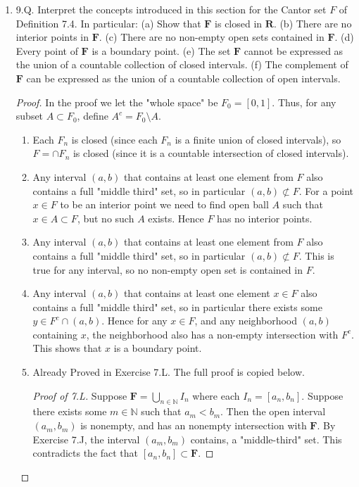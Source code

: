 \begin{enumerate}
\begin{proof}
\begin{enumerate}
	\item The empty set $\emptyset $ is closed and contains $\emptyset $, so $\emptyset \in \mathcal{C}(\emptyset )$ . Hence $\emptyset ^- = \emptyset $.

	\end{enumerate}
\end{proof}


\item 9.Q. Interpret the concepts introduced in this section for the Cantor set $F$ of Definition 7.4. In particular:
(a) Show that $\boldsymbol{F}$ is closed in $\boldsymbol{R}$.
(b) There are no interior points in $\boldsymbol{F}$.
(c) There are no non-empty open sets contained in $\boldsymbol{F}$.
(d) Every point of $\boldsymbol{F}$ is a boundary point.
(e) The set $\boldsymbol{F}$ cannot be expressed as the union of a countable collection of closed intervals.
(f) The complement of $\boldsymbol{F}$ can be expressed as the union of a countable collection of open intervals.
\begin{proof}
	In the proof we let the "whole space" be $F_0 = [0,1]$. Thus, for any subset  $A \subset F_0$, define $A^c = F_0 \setminus A$.
	\begin{enumerate}
		\item Each $F_n$ is closed (since each $F_n$ is a finite union of closed intervals), so $F = \cap F_n$ is closed (since it is a countable intersection of closed intervals).
		\item Any interval $(a,b)$ that contains at least one element from $F$ also contains a full "middle third" set, so in particular  $(a,b) \not \subset F$. For a point $x \in F$ to be an interior point we need to find open ball $A$ such that $x \in A \subset F$, but no such $A$ exists. Hence $F$ has no interior points.
		\item Any interval $(a,b)$ that contains at least one element from $F$ also contains a full "middle third" set, so in particular  $(a,b) \not \subset F$. This is true for any interval, so no non-empty open set is contained in $F$.
		\item Any interval $(a,b)$ that contains at least one element $x \in F$ also contains a full "middle third" set, so in particular there exists some $y \in F^c \cap (a,b)$. Hence for any $x \in F$, and any neighborhood $(a,b)$ containing $x$, the neighborhood also has a non-empty intersection with $F^c$. This shows that $x$ is a boundary point.
		\item Already Proved in Exercise 7.L. The full proof is copied below.
\begin{proof}[Proof of 7.L]
	Suppose $\mathbf{F} = \bigcup_{n \in \mathbb{N}} I_n$ where each $I_n = [a_n, b_n]$. Suppose there exists some $m \in \mathbb{N}$ such that $a_m < b_m$. Then the open interval $(a_m, b_m)$ is nonempty, and has an nonempty intersection with $\mathbf{F}$. By Exercise 7.J, the interval $(a_m, b_m)$ contains, a "middle-third" set. This contradicts the fact that $[a_n, b_n] \subset  \mathbf{F}$. 


\end{proof}
\end{enumerate}
\end{proof}
\end{enumerate}
